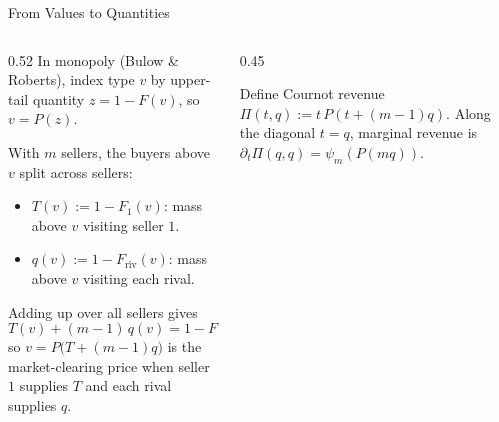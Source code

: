 \documentclass[11pt,aspectratio=169,handout]{beamer}
\def\seg#1#2#3#4{\fill[#3,draw=InkTwo,line width=0.3pt] (#1,#4) rectangle (#2,#4+0.42);}
\begin{document}
\begin{frame}{From Values to Quantities}
\begin{columns}[T]
\begin{column}{0.52\textwidth}
In monopoly (Bulow \& Roberts), index type $v$ by upper-tail quantity $z=1-F(v)$, so $v=P(z)$.

\medskip{}
With $m$ sellers, the buyers above $v$ split across sellers:
\begin{itemize}
\item $T(v):=1-F_1(v)$: mass above $v$ visiting seller $1$.
\item $q(v):=1-F_{\mathrm{riv}}(v)$: mass above $v$ visiting each rival.
\end{itemize}

Adding up over all sellers gives
\[
T(v)+(m-1)\,q(v)=1-F(v),
\]
so $v=P\bigl(T+(m-1)q\bigr)$ is the market-clearing price when seller $1$ supplies $T$ and each rival supplies $q$.
\end{column}
\begin{column}{0.45\textwidth}
\centering{}

\medskip
{\scriptsize Define Cournot revenue $\Pi(t,q):=t\,P(t+(m-1)q)$. Along the diagonal $t=q$, marginal revenue is $\partial_t\Pi(q,q)=\psi_m(P(mq))$.}
\end{column}
\end{columns}
\end{frame}
\end{document}

